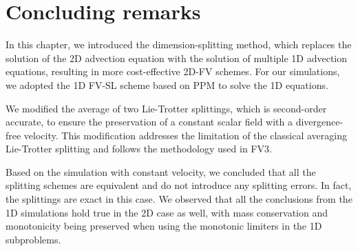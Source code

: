 %


\section{Concluding remarks}
In this chapter, we introduced the dimension-splitting method, 
which replaces the solution of the 2D advection equation with the
solution of multiple 1D advection equations, resulting in more cost-effective 2D-FV schemes. 
For our simulations, we adopted the 1D FV-SL scheme based on PPM to solve the 1D equations.

We modified the average of two Lie-Trotter splittings, which is second-order accurate,
to ensure the preservation of a constant scalar field with a divergence-free velocity.
This modification addresses the limitation of the classical averaging
Lie-Trotter splitting and follows the methodology used in FV3.

Based on the simulation with constant velocity, we concluded that all the splitting schemes
are equivalent and do not introduce any splitting errors. In fact, the splittings are exact in this case.
We observed that all the conclusions from the 1D simulations hold true in the 2D case as well,
with mass conservation and monotonicity being preserved when using the monotonic limiters in the 1D subproblems.

